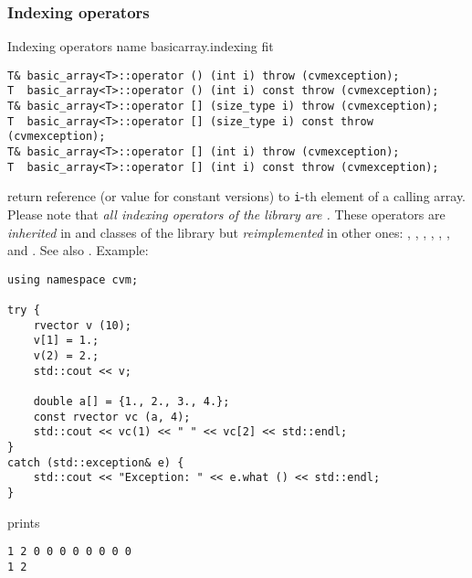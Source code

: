 \subsubsection{Indexing operators}
Indexing operators%
\pdfdest name {basicarray.indexing} fit
\begin{verbatim}
T& basic_array<T>::operator () (int i) throw (cvmexception);
T  basic_array<T>::operator () (int i) const throw (cvmexception);
T& basic_array<T>::operator [] (size_type i) throw (cvmexception);
T  basic_array<T>::operator [] (size_type i) const throw (cvmexception);
T& basic_array<T>::operator [] (int i) throw (cvmexception);
T  basic_array<T>::operator [] (int i) const throw (cvmexception);
\end{verbatim}
return  reference (or value for constant versions)
to \verb"i"-th element of a calling array. Please note that \emph{all indexing 
operators of the library are \Based.}
These operators are \emph{inherited} in 
 and  
classes of the library but \emph{reimplemented} in other ones:
,   ,
, ,
, ,
 and .
See also .
Example:
\begin{Verbatim}
using namespace cvm;

try {
    rvector v (10);
    v[1] = 1.;
    v(2) = 2.;
    std::cout << v;

    double a[] = {1., 2., 3., 4.};
    const rvector vc (a, 4);
    std::cout << vc(1) << " " << vc[2] << std::endl;
}
catch (std::exception& e) {
    std::cout << "Exception: " << e.what () << std::endl;
}
\end{Verbatim}
prints
\begin{Verbatim}
1 2 0 0 0 0 0 0 0 0
1 2
\end{Verbatim}
\newpage


